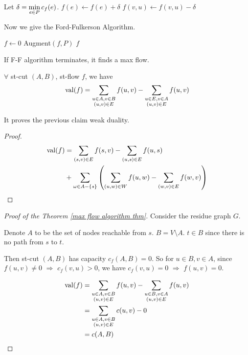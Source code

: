 \begin{algorithm}
    \caption{Augment $ (f,P) $}
    \begin{algorithmic}[1]
        \STATE Let  $ \delta=\displaystyle\min_{e\in P}c_f(e) $.
            \STATE$ f(e)\leftarrow f(e)+\delta $
            \ELSE \STATE $ f(v,u)\leftarrow f(v,u)-\delta $
            \ENDIF
        \ENDFOR
    \end{algorithmic}
\end{algorithm}


Now we give the Ford-Fulkerson Algorithm.
\begin{algorithm}
    \caption{Ford-Fulkerson Algorithm}
    \begin{algorithmic}[1]
        \STATE $ f\leftarrow 0 $
            \STATE Augment$ (f,P) $
        \ENDWHILE
        \RETURN $ f $
    \end{algorithmic}
\end{algorithm}
\begin{theorem}\label{max flow algorithm thm}
    If F-F algorithm terminates, it finds a max flow.
\end{theorem}

\begin{claim}
    $ \forall $ st-cut  $ (A,B) $, st-flow  $ f $, we have 
    \[\mathrm{val}(f)=\sum_{\substack{u\in A,v\in B\\(u,v)\in E}}f(u,v)-\sum_{\substack{u\in E,v\in A\\(u,v)\in E}}f(u,v)\]   
\end{claim}
It proves the previous claim weak duality.
\begin{proof}
    \begin{align*}
        \mathrm{val}(f)&=\sum_{(s,v)\in E}f(s,v)-\sum_{(u,s)\in E}f(u,s)\\
        &+\sum_{\omega\in A-\{s\}}\left(\sum_{(u,w)\in W}f(u,w)-\sum_{(w,v)\in E}f(w,v)\right)
    \end{align*}
\end{proof}
\begin{proof}[Proof of the Theorem \ref{max flow algorithm thm}]
    Consider the residue graph  $ G $.
    
    Denote  $ A $ to be the set of nodes reachable from  $ s $.
    $ B=V\setminus A $.  $ t\in B $ since there is no path from  $ s $ to  $ t $.   
    
    Then st-cut  $ (A,B) $ has capacity  $ c_f(A,B)=0 $. So for  $ u\in B,v\in A $, since  $ f(u,v)\neq 0 $  $ \Rightarrow  $ $ c_f(v,u)>0 $, we have  $ c_f(v,u)=0 $    $ \Rightarrow  $ $ f(u,v)=0 $.   
    
    \begin{align*}
        \mathrm{val}(f)&=\sum_{\substack{u\in A,v\in B\\(u,v)\in E}}f(u,v)-\sum_{\substack{u\in B,v\in A\\(u,v)\in E}}f(u,v)\\
        &=\sum_{\substack{u\in A,v\in B\\(u,v)\in E}}c(u,v)-0\\
        &=c(A,B)
    \end{align*}
\end{proof}

